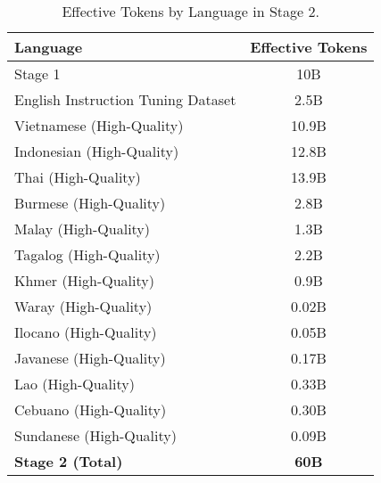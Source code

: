 \vspace{-1mm}
\begin{table}[ht]
\centering
\caption{Effective Tokens by Language in Stage 2.}
\begin{tabular}{lc}
\toprule
\textbf{Language} & \textbf{Effective Tokens} \\ \midrule
Stage 1 & 10B \\
English Instruction Tuning Dataset & 2.5B \\
Vietnamese (High-Quality) & 10.9B \\
Indonesian (High-Quality) & 12.8B \\
Thai (High-Quality) & 13.9B \\
Burmese (High-Quality) & 2.8B \\
Malay (High-Quality) & 1.3B \\
Tagalog (High-Quality) & 2.2B \\
Khmer (High-Quality) & 0.9B \\
Waray (High-Quality) & 0.02B \\
Ilocano (High-Quality) & 0.05B \\
Javanese (High-Quality) & 0.17B \\
Lao (High-Quality) & 0.33B \\
Cebuano (High-Quality) & 0.30B \\
Sundanese (High-Quality) & 0.09B \\ \midrule
\textbf{Stage 2 (Total)} & \textbf{60B} \\ \bottomrule
\end{tabular}
\label{tab:effective_tokens_stage2}
\end{table}
\vspace{-1mm}





